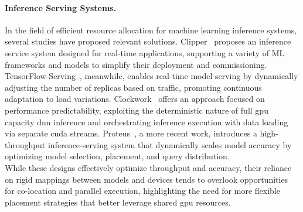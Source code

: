 \paragraph{Inference Serving Systems.}
In the field of efficient resource allocation for machine learning inference systems, several studies have proposed relevant solutions. Clipper~\cite{2017clipper} proposes an inference service system designed for real-time applications, supporting a variety of ML frameworks and models to simplify their deployment and commissioning. TensorFlow-Serving~\cite{olston2017tensorflowserving}, meanwhile, enables real-time model serving by dynamically adjusting the number of replicas based on traffic, promoting continuous adaptation to load variations. Clockwork~\cite{gujarati2020servingdnnslikeclockwork} offers an approach focused on performance predictability, exploiting the deterministic nature of full \acrshort{gpu} capacity \acrshort{dnn} inference and orchestrating inference execution with data loading via separate \acrshort{cuda} streams. Proteus~\cite{ahmad2024proteus}, a more recent work, introduces a high-throughput inference-serving system that dynamically scales model accuracy by optimizing model selection, placement, and query distribution.\\
While these designs effectively optimize throughput and accuracy, their reliance on rigid mappings between models and devices tends to overlook opportunities for co-location and parallel execution, highlighting the need for more flexible placement strategies that better leverage shared \acrshort{gpu} resources.

